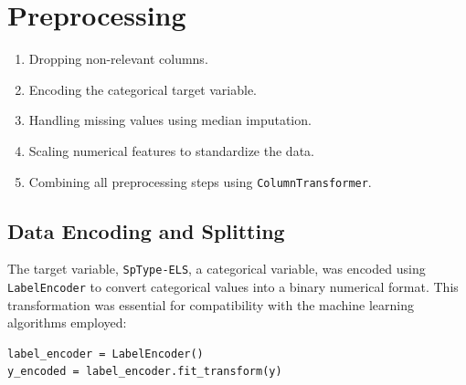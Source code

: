\section{Preprocessing}\label{s:preprocessing}

\begin{enumerate}
    \item Dropping non-relevant columns.
    \item Encoding the categorical target variable.
    \item Handling missing values using median imputation.
    \item Scaling numerical features to standardize the data.
    \item Combining all preprocessing steps using \texttt{ColumnTransformer}.
\end{enumerate}

\subsection{Data Encoding and Splitting}
The target variable, \texttt{SpType-ELS}, a categorical variable, was encoded using \texttt{LabelEncoder} to convert categorical values into a binary numerical format. This transformation was essential for compatibility with the machine learning algorithms employed:

\begin{verbatim}
label_encoder = LabelEncoder()
y_encoded = label_encoder.fit_transform(y)
\end{verbatim}

